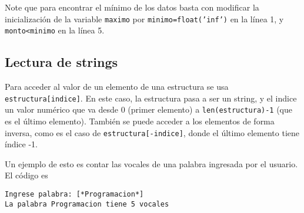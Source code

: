 Note que para encontrar el mínimo de los datos basta con modificar la inicialización de la variable \texttt{maximo} por \texttt{minimo=float('inf')} en la línea 1, y \texttt{monto<minimo} en la línea 5.

\subsection*{Lectura de strings}

Para acceder al valor de un elemento de una estructura se usa \texttt{estructura[indice]}. En este caso, la estructura pasa a ser un string, y el indice un valor numérico que va desde 0 (primer elemento) a \texttt{len(estructura)-1} (que es el último elemento). También se puede acceder a los elementos de forma inversa, como es el caso de \texttt{estructura[-indice]}, donde el último elemento tiene índice -1.

Un ejemplo de esto es contar las vocales de una palabra ingresada por el usuario. El código es 

 

\begin{lstlisting}[style=consola]
Ingrese palabra: [*Programacion*]
La palabra Programacion tiene 5 vocales
\end{lstlisting}

